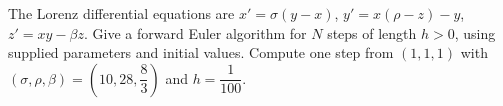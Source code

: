 The Lorenz differential equations are $x\prime=\sigma(y-x)$, $y\prime=x(\rho-z)-y$, $z\prime=xy-\beta z$. Give a forward Euler algorithm for $N$ steps of length $h>0$, using supplied parameters and initial values. Compute one step from $(1,1,1)$ with $(\sigma,\rho,\beta)=(10,28,\dfrac{8}{3})$ and $h=\dfrac{1}{100}$.
